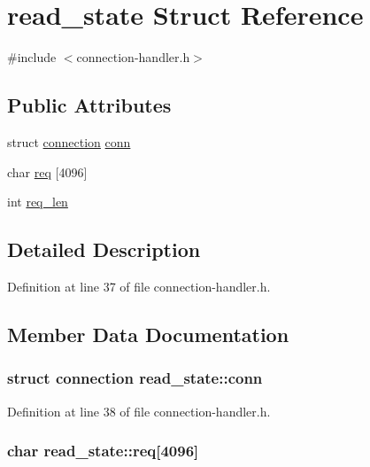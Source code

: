 \hypertarget{structread__state}{\section{read\-\_\-state Struct Reference}
\label{structread__state}
}


{\ttfamily \#include $<$connection-\/handler.\-h$>$}

\subsection*{Public Attributes}
\begin{DoxyCompactItemize}
\item 
struct \hyperlink{structconnection}{connection} \hyperlink{structread__state_ad79008defc69c985f9a55b8f1a7dccb0}{conn}
\item 
char \hyperlink{structread__state_a5466de2b0a95c12c669ff082e4a228d0}{req} \mbox{[}4096\mbox{]}
\item 
int \hyperlink{structread__state_a5629ae045b84454938394c8af94124d1}{req\-\_\-len}
\end{DoxyCompactItemize}


\subsection{Detailed Description}


Definition at line 37 of file connection-\/handler.\-h.



\subsection{Member Data Documentation}
\hypertarget{structread__state_ad79008defc69c985f9a55b8f1a7dccb0}{
\subsubsection[{conn}]{\setlength{\rightskip}{0pt plus 5cm}struct {\bf connection} read\-\_\-state\-::conn}}\label{structread__state_ad79008defc69c985f9a55b8f1a7dccb0}


Definition at line 38 of file connection-\/handler.\-h.

\hypertarget{structread__state_a5466de2b0a95c12c669ff082e4a228d0}{
\subsubsection[{req}]{\setlength{\rightskip}{0pt plus 5cm}char read\-\_\-state\-::req\mbox{[}4096\mbox{]}}}\label{structread__state_a5466de2b0a95c12c669ff082e4a228d0}



